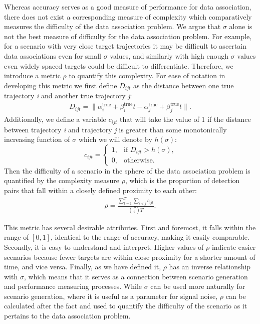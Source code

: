 Whereas accuracy serves as a good measure of performance for data association, there does not exist a corresponding measure of complexity which comparatively measures the difficulty of the data association problem. We argue that $\sigma$ alone is not the best measure of difficulty for the data association problem. For example, for a scenario with very close target trajectories it may be difficult to ascertain data associations even for small $\sigma$ values, and similarly with high enough $\sigma$ values even widely spaced targets could be difficult to differentiate. Therefore, we introduce a metric $\rho$ to quantify this complexity. For ease of notation in developing this metric we first define $D_{ijt}$ as the distance between one true trajectory \textit{i} and another true trajectory \textit{j}:
\begin{align*}
D_{ijt} = \| \alpha^{\text{true}}_{i} + \beta^{\text{true}}_{i}t - \alpha^{\text{true}}_{j} + \beta^{\text{true}}_{j}t \|.
\end{align*}
Additionally, we define a variable $c_{ijt}$ that will take the value of 1 if the distance between trajectory \textit{i} and trajectory \textit{j} is greater than some monotonically increasing function of $\sigma$ which we will denote by $h(\sigma)$: 
\[c_{ijt} = 
\begin{cases}
1, & \text{if $D_{ijt} > h(\sigma)$,}\\
0, & \text{otherwise.}
\end{cases}\]
Then the difficulty of a scenario in the sphere of the data association problem is quantified by the complexity measure $\rho$, which is the proportion of detection pairs that fall within a closely defined proximity to each other:
\begin{align*}
\rho =  \frac{\sum\limits_{t=1}^{T}\sum\limits_{i<j}c_{ijt}}{\binom{P}{2} T}.
\end{align*}

This metric has several desirable attributes. First and foremost, it falls within the range of $[0,1]$, identical to the range of accuracy, making it easily comparable. Secondly, it is easy to understand and interpret. Higher values of $\rho$ indicate easier scenarios because fewer targets are within close proximity for a shorter amount of time, and vice versa. Finally, as we have defined it, $\rho$ has an inverse relationship with $\sigma$, which means that it serves as a connection between scenario generation and performance measuring processes. While $\sigma$ can be used more naturally for scenario generation, where it is useful as a parameter for signal noise, $\rho$ can be calculated after the fact and used to quantify the difficulty of the scenario as it pertains to the data association problem. 

